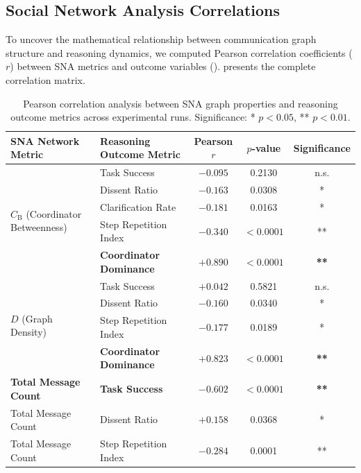 \documentclass[conference]{IEEEtran}
\newcommand{\CB}{C_{\mathrm{B}}}    %
\newcommand{\rowhl}{\rowcolor{rowgray}}
\begin{document}
\subsection{Social Network Analysis Correlations}
\label{sec:sna_results}

To uncover the mathematical relationship between communication graph structure and reasoning dynamics, we computed Pearson correlation coefficients ($r$) between SNA metrics and outcome variables ().  presents the complete correlation matrix.

\begin{table}[t]
\centering
\caption{Pearson correlation analysis between SNA graph properties and reasoning outcome metrics across experimental runs. Significance: * $p < 0.05$, ** $p < 0.01$.}
\label{tab:sna_correlations}
\begin{tabular}{llccc}
\toprule
\textbf{SNA Network Metric} & \textbf{Reasoning Outcome Metric} & \textbf{Pearson $r$} & \textbf{$p$-value} & \textbf{Significance} \\
\midrule
\multirow{5}{*}{$\CB$ (Coordinator Betweenness)}
  & Task Success             & $-0.095$ & 0.2130 & n.s. \\
  & Dissent Ratio            & $-0.163$ & 0.0308 & * \\
  & Clarification Rate       & $-0.181$ & 0.0163 & * \\
  & Step Repetition Index    & $-0.340$ & $<0.0001$ & ** \\
\rowhl
  & \textbf{Coordinator Dominance} & $\mathbf{+0.890}$ & $\mathbf{<0.0001}$ & \textbf{**} \\
\midrule
\multirow{4}{*}{$D$ (Graph Density)}
  & Task Success             & $+0.042$ & 0.5821 & n.s. \\
  & Dissent Ratio            & $-0.160$ & 0.0340 & * \\
  & Step Repetition Index    & $-0.177$ & 0.0189 & * \\
\rowhl
  & \textbf{Coordinator Dominance} & $\mathbf{+0.823}$ & $\mathbf{<0.0001}$ & \textbf{**} \\
\midrule
\rowhl
\textbf{Total Message Count} & \textbf{Task Success} & $\mathbf{-0.602}$ & $\mathbf{<0.0001}$ & \textbf{**} \\
Total Message Count          & Dissent Ratio         & $+0.158$ & 0.0368 & * \\
Total Message Count          & Step Repetition Index & $-0.284$ & 0.0001 & ** \\
\bottomrule
\end{tabular}
\end{table}
\end{document}
